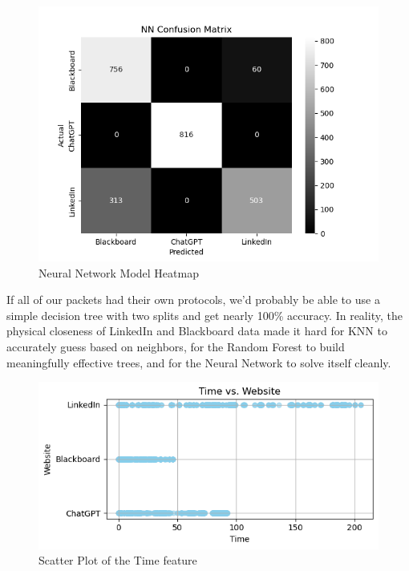 \documentclass[10pt,sigconf,letterpaper,nonacm]{acmart}
\begin{document}
\begin{figure}
    \centering
    \includegraphics[width=1\linewidth]{Figures_and_Graphs/ConfusionMatrixNN.png}
    \caption{Neural Network Model Heatmap}
    \label{fig:nn_heatmap}
\end{figure}

If all of our packets had their own protocols, we'd probably be able to use a simple decision tree with two splits and get nearly 100\% accuracy.
In reality, the physical closeness of LinkedIn and Blackboard data made it hard for KNN to accurately guess based on neighbors, for the Random Forest to build meaningfully effective trees, and for the Neural Network to solve itself cleanly.

\begin{figure}
    \centering
    \includegraphics[width=1\linewidth]{Figures_and_Graphs/time_scatter.png}
    \caption{Scatter Plot of the Time feature}
    \label{fig:time_scatter}
\end{figure}
\end{document}
